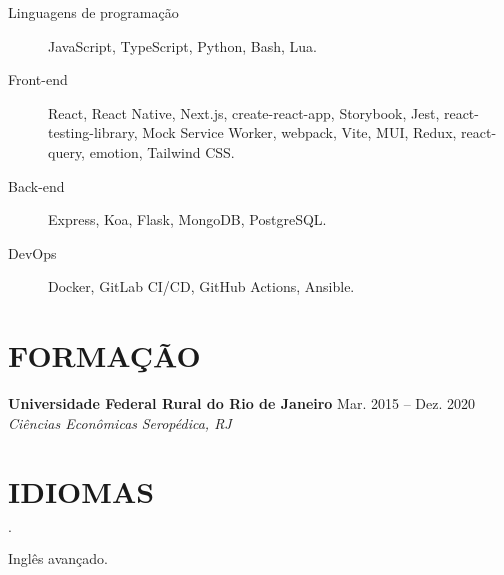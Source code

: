 \documentclass[12pt]{article}
\newenvironment{tightlist}
  {\begin{list}
    {$\cdot$}
    {
      \setlength{\leftmargin}{0em}
      \setlength{\itemsep}{\smallskipamount}
    }
  }
{\end{list}}
\begin{document}
\begin{description}
  \item[Linguagens de programação] JavaScript, TypeScript, Python, Bash, Lua.
  \item[Front-end] React, React Native, Next.js, create-react-app, Storybook,
    Jest, react-testing-library, Mock Service Worker, webpack, Vite, MUI, Redux,
    react-query, emotion, Tailwind CSS.
  \item[Back-end] Express, Koa, Flask, MongoDB, PostgreSQL.
  \item[DevOps] Docker, GitLab CI/CD, GitHub Actions, Ansible.
\end{description}

\section*{FORMAÇÃO}

\textbf{Universidade Federal Rural do Rio de Janeiro} \hfill {Mar. 2015 -- Dez. 2020} \\
\textit{Ciências Econômicas} \hfill \textit{Seropédica, RJ} {\parfillskip=0pt\par}

\section*{IDIOMAS}

\begin{tightlist}
  \item Inglês avançado.
\end{tightlist}
\end{document}
